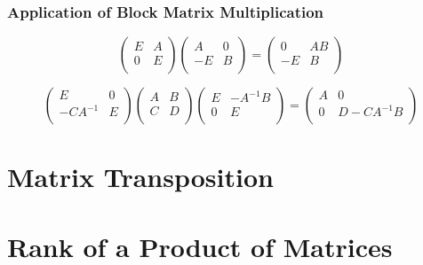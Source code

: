 \documentclass[onecolumn]{ctexart}
\begin{document}
\subsubsection{Application of Block Matrix Multiplication}

\begin{equation}
  \begin{pmatrix}
    E & A \\
    0 & E \\
  \end{pmatrix}
  \begin{pmatrix}
    A & 0 \\
    -E & B \\
  \end{pmatrix} =
  \begin{pmatrix}
    0 & AB \\
    -E & B \\
  \end{pmatrix}
\end{equation}

\begin{equation}
  \begin{pmatrix}
    E & 0 \\
    -CA^{-1} & E \\
  \end{pmatrix}
  \begin{pmatrix}
    A & B \\
    C & D \\
  \end{pmatrix}
  \begin{pmatrix}
    E & -A^{-1}B \\
    0 & E \\
  \end{pmatrix} = 
  \begin{pmatrix}
    A & 0 \\
    0 & D - CA^{-1}B \\
  \end{pmatrix}
\end{equation}

\section{Matrix Transposition}

\section{Rank of a Product of Matrices}
\end{document}

